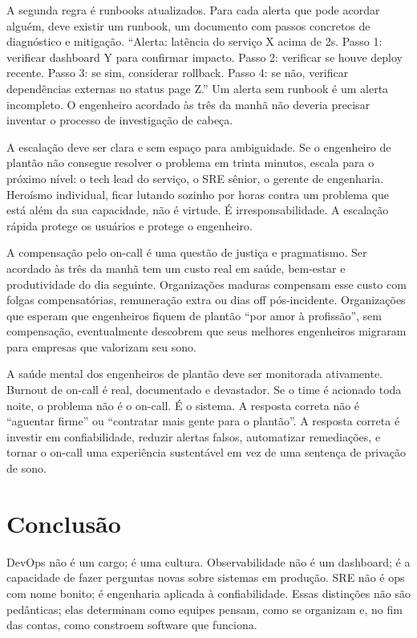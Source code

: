 A segunda regra é runbooks atualizados. Para cada alerta que pode acordar alguém,
deve existir um runbook, um documento com passos concretos de diagnóstico e
mitigação. ``Alerta: latência do serviço X acima de 2s. Passo 1: verificar
dashboard Y para confirmar impacto. Passo 2: verificar se houve deploy recente.
Passo 3: se sim, considerar rollback. Passo 4: se não, verificar dependências
externas no status page Z.'' Um alerta sem runbook é um alerta incompleto. O
engenheiro acordado às três da manhã não deveria precisar inventar o processo de
investigação de cabeça.

A escalação deve ser clara e sem espaço para ambiguidade. Se o engenheiro de
plantão não consegue resolver o problema em trinta minutos, escala para o
próximo nível: o tech lead do serviço, o SRE sênior, o gerente de engenharia.
Heroísmo individual, ficar lutando sozinho por horas contra um problema que
está além da sua capacidade, não é virtude. É irresponsabilidade. A escalação
rápida protege os usuários e protege o engenheiro.

A compensação pelo on-call é uma questão de justiça e pragmatismo. Ser acordado
às três da manhã tem um custo real em saúde, bem-estar e produtividade do dia
seguinte. Organizações maduras compensam esse custo com folgas compensatórias,
remuneração extra ou dias off pós-incidente. Organizações que esperam que
engenheiros fiquem de plantão ``por amor à profissão'', sem compensação,
eventualmente descobrem que seus melhores engenheiros migraram para empresas
que valorizam seu sono.

A saúde mental dos engenheiros de plantão deve ser monitorada
ativamente. Burnout de on-call é real, documentado e devastador. Se o time
é acionado toda noite, o problema não é o on-call. É o sistema. A resposta
correta não é ``aguentar firme'' ou ``contratar mais gente para o plantão''.
A resposta correta é investir em confiabilidade, reduzir alertas falsos,
automatizar remediações, e tornar o on-call uma experiência sustentável em
vez de uma sentença de privação de sono.

\section{Conclusão}

DevOps não é um cargo; é uma cultura. Observabilidade não é um dashboard;
é a capacidade de fazer perguntas novas sobre sistemas em produção. SRE não é
ops com nome bonito; é engenharia aplicada à confiabilidade. Essas distinções
não são pedânticas; elas determinam como equipes pensam, como se organizam e,
no fim das contas, como constroem software que funciona.

